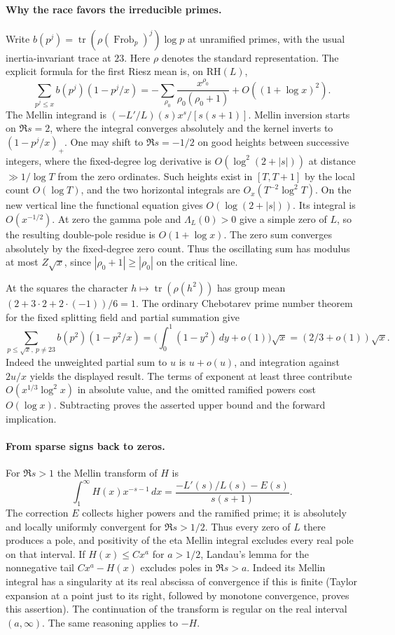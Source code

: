 \paragraph{Why the race favors the irreducible primes.}
Write $b(p^j)=\operatorname{tr}(\rho(\operatorname{Frob}_p)^j)\log p$
at unramified primes, with the usual inertia-invariant trace at $23$.
Here $\rho$ denotes the standard representation.
The explicit formula for the first Riesz mean is, on $\mathrm{RH}(L)$,
\[
 \sum_{p^j\le x} b(p^j)(1-p^j/x)
   =-\sum_{\rho_0}\frac{x^{\rho_0}}{\rho_0(\rho_0+1)}
       +O((1+\log x)^2).
\]
The Mellin integrand is $(-L'/L)(s)x^s/[s(s+1)]$.
Mellin inversion starts on $\Re s=2$, where the integral converges
absolutely and the kernel inverts to $(1-p^j/x)_+$. One may shift to $\Re s=-1/2$ on good heights between successive
integers, where the fixed-degree log derivative is $O(\log^2(2+|s|))$
at distance $\gg1/\log T$ from the zero ordinates. Such heights
exist in $[T,T+1]$ by the local count $O(\log T)$, and the two
horizontal integrals are $O_x(T^{-2}\log^2 T)$. On the new vertical line the functional equation gives
$O(\log(2+|s|))$. Its integral is $O(x^{-1/2})$.
At zero the gamma pole and $\Lambda_L(0)>0$ give a simple zero of $L$,
so the resulting double-pole residue is $O(1+\log x)$.
The zero sum converges absolutely by the fixed-degree zero count.
Thus the oscillating sum has modulus at most $Z\sqrt{x}$, since
$|\rho_0+1|\ge|\rho_0|$ on the critical line.

At the squares the character $h\mapsto\operatorname{tr}(\rho(h^2))$
has group mean $(2+3\cdot2+2\cdot(-1))/6=1$.
The ordinary Chebotarev prime number theorem for the fixed splitting field
and partial summation give
\[
 \sum_{p\le\sqrt x,\ p\ne23} b(p^2)(1-p^2/x)
 =\biggl(\int_0^1(1-y^2)\,dy+o(1)\biggr)\sqrt{x}
 =(2/3+o(1))\sqrt{x}.
\]
Indeed the unweighted partial sum to $u$ is $u+o(u)$, and integration
against $2u/x$ yields the displayed result.
The terms of exponent at least three contribute $O(x^{1/3}\log^2 x)$
in absolute value, and the omitted ramified powers cost $O(\log x)$.
Subtracting proves the asserted upper bound and the forward implication.

\paragraph{From sparse signs back to zeros.}
For $\Re s>1$ the Mellin transform of $H$ is
\[
 \int_1^\infty H(x)x^{-s-1}\,dx
  =\frac{-L'(s)/L(s)-E(s)}{s(s+1)}.
\]
The correction $E$ collects higher powers and the ramified prime;
it is absolutely and locally uniformly convergent for $\Re s>1/2$.
Thus every zero of $L$ there produces a pole, and positivity of the
eta Mellin integral excludes every real pole on that interval.
If $H(x)\le Cx^a$ for $a>1/2$, Landau's lemma for the nonnegative
tail $Cx^a-H(x)$ excludes poles in $\Re s>a$. Indeed its Mellin
integral has a singularity at its real abscissa of convergence if this
is finite (Taylor expansion at a point just to its right, followed
by monotone convergence, proves this assertion). The continuation of
the transform is regular on the real interval $(a,\infty)$.
The same reasoning applies to $-H$.

